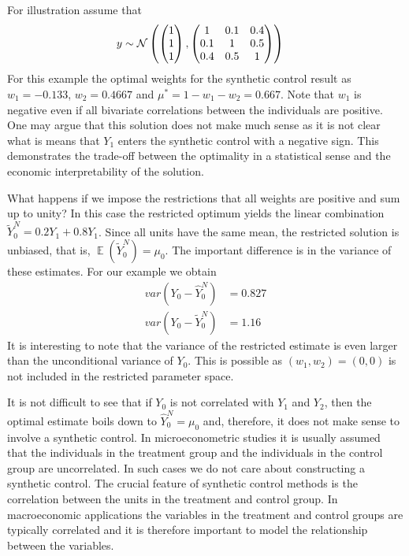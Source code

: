 \documentclass[12pt,a4paper]{article}
\def\E{\mathop{\mathbb{E}}\limits}
\begin{document}
For illustration assume that
\begin{align*}
y &\sim {\cal N}\left( \begin{pmatrix} 1 \\ 1 \\ 1 \end{pmatrix}, \begin{pmatrix} 1 &  0.1 & 0.4 \\ 0.1 & 1 & 0.5 \\ 0.4 & 0.5 & 1 \end{pmatrix} \right)
\end{align*}
For this example the optimal weights for the synthetic control result as $w_1=-0.133$, $w_2=0.4667$ and $\mu^*=1-w_1-w_2=0.667$. Note that $w_1$ is negative even if all bivariate correlations between the individuals are positive. One may argue that this solution does not make much sense as it is not clear what is means that $Y_1$  enters the synthetic control with a negative sign. This demonstrates the trade-off between the optimality in a statistical sense and the economic interpretability of the solution.

What happens if we impose the restrictions that all weights are positive and sum up to unity? In this case the restricted optimum yields the linear combination $\widetilde Y_0^N =0.2 Y_1 + 0.8 Y_1$. Since all units have the same mean, the restricted solution is unbiased, that is, $\E(\widetilde Y_0^N)=\mu_0$. The important difference is in the variance of these estimates. For our example we obtain
\begin{align*}
var(Y_0 - \widehat Y_0^N ) &= 0.827 \\
var(Y_0 - \widetilde Y_0^N ) &= 1.16
\end{align*}
It is interesting to note that the variance of the restricted estimate is even larger than the unconditional variance of $Y_0$. This is possible as $(w_1,w_2)=(0,0)$ is not included in the restricted parameter space.

It is not difficult to see that if $Y_0$ is not correlated with $Y_1$ and $Y_2$, then the optimal estimate boils down to $\widehat Y_0^N  = \mu_0$ and, therefore, it does not make sense to involve a synthetic control. In microeconometric studies it is usually assumed that the individuals in the treatment group and the individuals in the control group are uncorrelated. In such cases we do not care about constructing a synthetic control. The crucial feature of synthetic control methods is the correlation between the units in the treatment and control group. In macroeconomic applications the variables in the treatment and control groups are typically correlated and it is therefore important to model the relationship between the variables.
\end{document}
